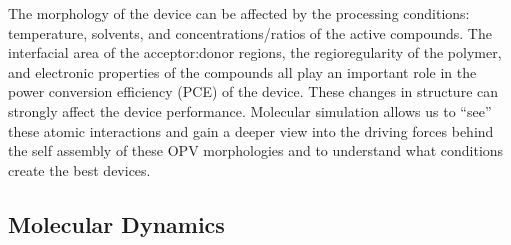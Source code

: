 The morphology of the device can be affected by the processing conditions: temperature, solvents, and concentrations/ratios of the active compounds\cite{Ma2005,Hoppe2004a,Li2007}.
The interfacial area of the acceptor:donor regions\cite{Mazzio2015}, the regioregularity of the polymer\cite{Kim2006}, and electronic properties of the compounds\cite{Scharber2006a} all play an important role in the power conversion efficiency (PCE) of the device. 
These changes in structure can strongly affect the device performance.
Molecular simulation allows us to ``see'' these atomic interactions and gain a deeper view into the driving forces behind the self assembly of these OPV morphologies and to understand what conditions create the best devices.

\subsection*{Molecular Dynamics}

